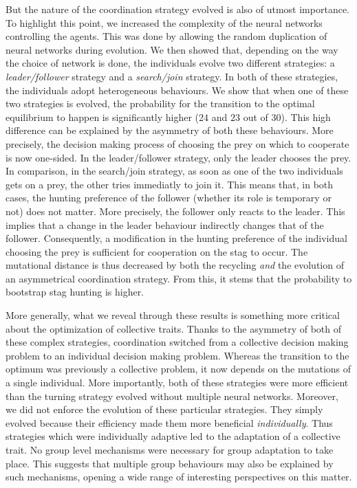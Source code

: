   But the nature of the coordination strategy evolved is also of utmost importance. To highlight this point, we increased the complexity of the neural networks controlling the agents. This was done by allowing the random duplication of neural networks during evolution. We then showed that, depending on the way the choice of network is done, the individuals evolve two different strategies: a \emph{leader/follower} strategy and a \emph{search/join} strategy. In both of these strategies, the individuals adopt heterogeneous behaviours. We show that when one of these two strategies is evolved, the probability for the transition to the optimal equilibrium to happen is significantly higher ($24$ and $23$ out of $30$). This high difference can be explained by the asymmetry of both these behaviours. More precisely, the decision making process of choosing the prey on which to cooperate is now one-sided. In the leader/follower strategy, only the leader chooses the prey. In comparison, in the search/join strategy, as soon as one of the two individuals gets on a prey, the other tries immediatly to join it. This means that, in both cases, the hunting preference of the follower (whether its role is temporary or not) does not matter. More precisely, the follower only reacts to the leader. This implies that a change in the leader behaviour indirectly changes that of the follower. Consequently, a modification in the hunting preference of the individual choosing the prey is sufficient for cooperation on the stag to occur. The mutational distance is thus decreased by both the recycling \emph{and} the evolution of an asymmetrical coordination strategy. From this, it stems that the probability to bootstrap stag hunting is higher. 

  More generally, what we reveal through these results is something more critical about the optimization of collective traits. Thanks to the asymmetry of both of these complex strategies, coordination switched from a collective decision making problem to an individual decision making problem. Whereas the transition to the optimum was previously a collective problem, it now depends on the mutations of a single individual. More importantly, both of these strategies were more efficient than the turning strategy evolved without multiple neural networks. Moreover, we did not enforce the evolution of these particular strategies. They simply evolved because their efficiency made them more beneficial \emph{individually}. Thus strategies which were individually adaptive led to the adaptation of a collective trait. No group level mechanisms were necessary for group adaptation to take place. This suggests that multiple group behaviours may also be explained by such mechanisms, opening a wide range of interesting perspectives on this matter.


